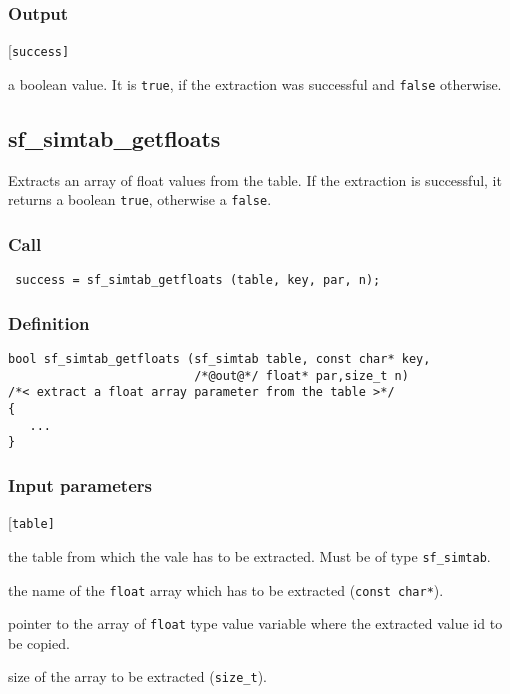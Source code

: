 \subsubsection*{Output}
\begin{desclist}{\tt }{\quad}[\tt success]
   \setlength\itemsep{0pt}
   \item[success] a boolean value. It is \texttt{true}, if the extraction was successful and \texttt{false} otherwise.
\end{desclist}




\subsection{{sf\_simtab\_getfloats}}\label{sec:sf_simtab_getfloats}
Extracts an array of float values from the table. If the extraction is successful, it returns a boolean \texttt{true}, otherwise a \texttt{false}. 

\subsubsection*{Call}
\begin{verbatim} success = sf_simtab_getfloats (table, key, par, n);\end{verbatim}

\subsubsection*{Definition}
\begin{verbatim}
bool sf_simtab_getfloats (sf_simtab table, const char* key,
                          /*@out@*/ float* par,size_t n)
/*< extract a float array parameter from the table >*/
{
   ... 
}
\end{verbatim}

\subsubsection*{Input parameters}
\begin{desclist}{\tt }{\quad}[\tt table]
   \setlength\itemsep{0pt}
   \item[table] the table from which the vale has to be extracted. Must be of type \texttt{sf\_simtab}.
   \item[key]   the name of the \texttt{float} array which has to be extracted (\texttt{const char*}).
   \item[par]   pointer to the array of \texttt{float} type value variable where the extracted value id to be copied.
   \item[n]     size of the array to be extracted (\texttt{size\_t}).
\end{desclist}

